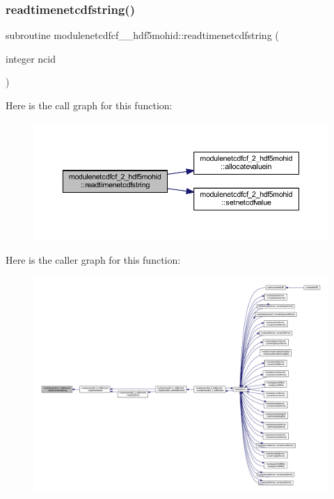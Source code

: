\subsubsection{\texorpdfstring{readtimenetcdfstring()}{readtimenetcdfstring()}}
{\footnotesize\ttfamily subroutine modulenetcdfcf\+\_\+\_\+hdf5mohid\+::readtimenetcdfstring (\begin{DoxyParamCaption}\item[{integer}]{ncid }\end{DoxyParamCaption})\hspace{0.3cm}{\ttfamily [private]}}

Here is the call graph for this function\+:\nopagebreak
\begin{figure}[H]
\begin{center}
\leavevmode
\includegraphics[width=350pt]{namespacemodulenetcdfcf__2__hdf5mohid_a3208523531a4e193ad1b485436dad44a_cgraph}
\end{center}
\end{figure}
Here is the caller graph for this function\+:\nopagebreak
\begin{figure}[H]
\begin{center}
\leavevmode
\includegraphics[width=350pt]{namespacemodulenetcdfcf__2__hdf5mohid_a3208523531a4e193ad1b485436dad44a_icgraph}
\end{center}
\end{figure}
\mbox{\label{namespacemodulenetcdfcf__2__hdf5mohid_ab249ad2d3a887227db840c6a431fe4a4}} 

